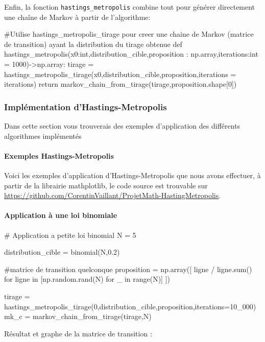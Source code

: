 \documentclass{article}
\begin{document}
Enfin, la fonction \texttt{hastings\_metropolis} combine tout pour générer directement une chaîne de Markov à partir de l'algorithme:

\begin{python}
#Utilise hastings_metropolis_tirage pour creer une chaine de Markov (matrice de transition) ayant la distribution du tirage obtenue  
def hastings_metropolis(x0:int,distribution_cible,proposition : np.array,iterations:int = 1000)->np.array:
    tirage = hastings_metropolis_tirage(x0,distribution_cible,proposition,iterations = iterations)
    return markov_chain_from_tirage(tirage,proposition.shape[0])    
\end{python}

\newpage
\subsubsection{Implémentation d'Hastings-Metropolis}

Dans cette section vous trouverais des exemples d'application des différents algorithmes implémentés 

\paragraph{Exemples Hastings-Metropolis}

Voici les exemples d'application d'Hastings-Metropolis que nous avons effectuer,
à partir de la librairie mathplotlib, le code source est trouvable sur \url{https://github.com/CorentinVaillant/ProjetMath-HastingMetropolis}.

\paragraph{Application à une loi binomiale}
\begin{center}
\begin{python}
# Application a petite loi binomial
N = 5

distribution_cible = binomial(N,0.2)

#matrice de transition quelconque
proposition = np.array([ ligne / ligne.sum()
    for ligne in [np.random.rand(N) for _ in range(N)]
])


tirage = hastings_metropolis_tirage(0,distribution_cible,proposition,iterations=10_000)
mk_c = markov_chain_from_tirage(tirage,N)
\end{python}
\end{center}
Résultat et graphe de la matrice de transition :
\end{document}
